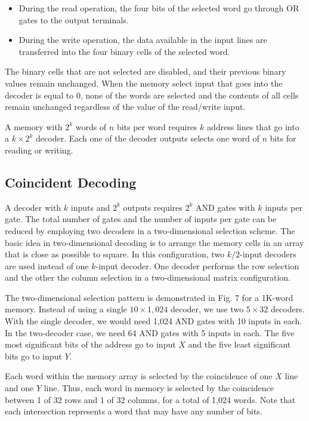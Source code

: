 \begin{multicols}{2}
\setlength{\columnsep}{1.5cm}
\setlength{\columnseprule}{0.2pt}

\begin{itemize}
  \item During the read operation, the four bits of the selected word go through OR gates to the output terminals.
  \item During the write operation, the data available in the input lines are transferred into the four binary cells of the selected word.
\end{itemize}

The binary cells that are not selected are disabled, and their previous binary values remain unchanged. When the memory select input that goes into the decoder is equal to 0, none of the words are selected and the contents of all cells remain unchanged regardless of the value of the read/write input.

A memory with $2^k$ words of $n$ bits per word requires $k$ address lines that go into a $k \times 2^k$ decoder. Each one of the decoder outputs selects one word of $n$ bits for reading or writing.

\vspace*{\fill}
\columnbreak

\subsection{Coincident Decoding}
\label{subsec:coincident-decoding}

A decoder with $k$ inputs and $2^k$ outputs requires $2^k$ AND gates with $k$ inputs per gate. The total number of gates and the number of inputs per gate can be reduced by employing two decoders in a two-dimensional selection scheme. The basic idea in two-dimensional decoding is to arrange the memory cells in an array that is close as possible to square. In this configuration, two $k/2$-input decoders are used instead of one $k$-input decoder. One decoder performs the row selection and the other the column selection in a two-dimensional matrix configuration.

The two-dimensional selection pattern is demonstrated in Fig. 7 for a 1K-word memory. Instead of using a single $10 \times 1,024$ decoder, we use two $5 \times 32$ decoders. With the single decoder, we would need 1,024 AND gates with 10 inputs in each. In the two-decoder case, we need 64 AND gates with 5 inputs in each. The five most significant bits of the address go to input $X$ and the five least significant bits go to input $Y$.

Each word within the memory array is selected by the coincidence of one $X$ line and one $Y$ line. Thus, each word in memory is selected by the coincidence between 1 of 32 rows and 1 of 32 columns, for a total of 1,024 words. Note that each intersection represents a word that may have any number of bits.
\end{multicols}

